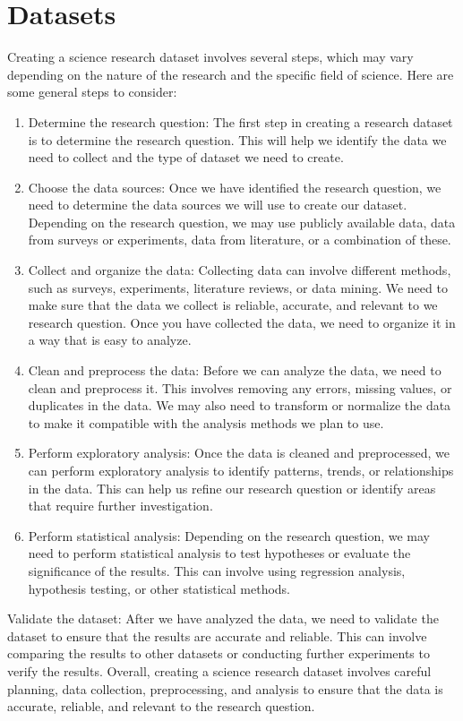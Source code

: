         \section{Datasets} \label{subsec:datasets}
        Creating a science research dataset involves several steps, which may vary depending on the nature of the
        research and the specific field of science. Here are some general steps to consider:
        \begin{enumerate}
            \item Determine the research question: The first step in creating a research dataset is to determine the
            research question. This will help we identify the data we need to collect and the type of dataset
            we need to create.
            \item Choose the data sources: Once we have identified the research question, we need to determine
            the data sources we will use to create our dataset. Depending on the research question, we may use
            publicly available data, data from surveys or experiments, data from literature, or a combination of these.
            \item Collect and organize the data: Collecting data can involve different methods, such as surveys,
            experiments, literature reviews, or data mining. We need to make sure that the data we collect is reliable,
            accurate, and relevant to we research question. Once you have collected the data, we need to organize
            it in a way that is easy to analyze.
            \item Clean and preprocess the data: Before we can analyze the data, we need to clean and preprocess it.
            This involves removing any errors, missing values, or duplicates in the data. We may also need to
            transform or normalize the data to make it compatible with the analysis methods we plan to use.
            \item Perform exploratory analysis: Once the data is cleaned and preprocessed, we can perform exploratory
            analysis to identify patterns, trends, or relationships in the data. This can help us refine our research
            question or identify areas that require further investigation.
            \item Perform statistical analysis: Depending on the research question, we may need to perform statistical
            analysis to test hypotheses or evaluate the significance of the results. This can involve using regression
            analysis, hypothesis testing, or other statistical methods.
        \end{enumerate}
        Validate the dataset: After we have analyzed the data, we need to validate the dataset to ensure that the
        results are accurate and reliable. This can involve comparing the results to other datasets or conducting
        further experiments to verify the results. Overall, creating a science research dataset involves careful
        planning, data collection, preprocessing, and analysis to ensure that the data is accurate, reliable, and
        relevant to the research question.
